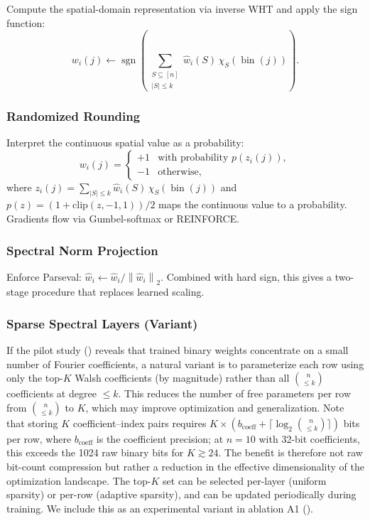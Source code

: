 \documentclass[12pt,a4paper]{article}
\theoremstyle{plain}
\theoremstyle{definition}
\theoremstyle{remark}
\newcommand{\what}{\widehat{w}}
\newcommand{\sgn}{\operatorname{sgn}}
\newcommand{\norm}[1]{\left\| #1 \right\|}
\DeclareMathOperator{\bin}{bin}
\begin{document}
Compute the spatial-domain representation via inverse WHT and apply the sign function:
\begin{equation}\label{eq:hard-sign}
    w_i(j) \leftarrow \sgn\!\left( \sum_{\substack{S \subseteq [n] \\ |S| \leq k}} \what_i(S)\, \chi_S(\bin(j)) \right).
\end{equation}

\subsubsection{Randomized Rounding}\label{sec:random-rounding}

Interpret the continuous spatial value as a probability:
\begin{equation}\label{eq:random-round}
    w_i(j) =
    \begin{cases}
        +1 & \text{with probability } p(z_i(j)), \\
        -1 & \text{otherwise},
    \end{cases}
\end{equation}
where $z_i(j) = \sum_{|S| \leq k} \what_i(S)\, \chi_S(\bin(j))$ and $p(z) = (1+\text{clip}(z,-1,1))/2$ maps the continuous value to a probability. Gradients flow via Gumbel-softmax or REINFORCE.

\subsubsection{Spectral Norm Projection}\label{sec:spectral-norm-proj}

Enforce Parseval: $\what_i \leftarrow \what_i / \norm{\what_i}_2$. Combined with hard sign, this gives a two-stage procedure that replaces learned scaling.

\subsubsection{Sparse Spectral Layers (Variant)}\label{sec:sparse-spectral}

If the pilot study () reveals that trained binary weights concentrate on a small number of Fourier coefficients, a natural variant is to parameterize each row using only the top-$K$ Walsh coefficients (by magnitude) rather than all $\binom{n}{\leq k}$ coefficients at degree $\leq k$. This reduces the number of free parameters per row from $\binom{n}{\leq k}$ to $K$, which may improve optimization and generalization. Note that storing $K$ coefficient--index pairs requires $K \times (b_{\text{coeff}} + \lceil\log_2 \binom{n}{\leq k}\rceil)$ bits per row, where $b_{\text{coeff}}$ is the coefficient precision; at $n = 10$ with 32-bit coefficients, this exceeds the 1024 raw binary bits for $K \gtrsim 24$. The benefit is therefore not raw bit-count compression but rather a reduction in the effective dimensionality of the optimization landscape. The top-$K$ set can be selected per-layer (uniform sparsity) or per-row (adaptive sparsity), and can be updated periodically during training. We include this as an experimental variant in ablation A1 ().
\end{document}
